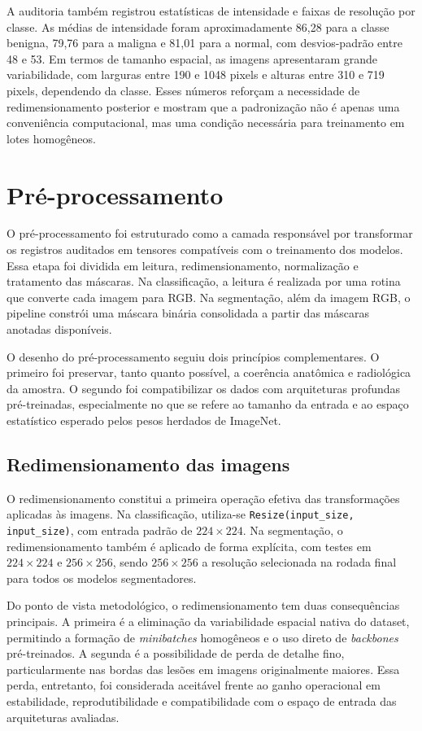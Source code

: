 \documentclass[tcc,capa]{texufpel}
\begin{document}
A auditoria também registrou estatísticas de intensidade e faixas de resolução por classe. As médias de intensidade foram aproximadamente 86,28 para a classe benigna, 79,76 para a maligna e 81,01 para a normal, com desvios-padrão entre 48 e 53. Em termos de tamanho espacial, as imagens apresentaram grande variabilidade, com larguras entre 190 e 1048 pixels e alturas entre 310 e 719 pixels, dependendo da classe. Esses números reforçam a necessidade de redimensionamento posterior e mostram que a padronização não é apenas uma conveniência computacional, mas uma condição necessária para treinamento em lotes homogêneos.

\section{Pré-processamento}

O pré-processamento foi estruturado como a camada responsável por transformar os registros auditados em tensores compatíveis com o treinamento dos modelos. Essa etapa foi dividida em leitura, redimensionamento, normalização e tratamento das máscaras. Na classificação, a leitura é realizada por uma rotina que converte cada imagem para RGB. Na segmentação, além da imagem RGB, o pipeline constrói uma máscara binária consolidada a partir das máscaras anotadas disponíveis.

O desenho do pré-processamento seguiu dois princípios complementares. O primeiro foi preservar, tanto quanto possível, a coerência anatômica e radiológica da amostra. O segundo foi compatibilizar os dados com arquiteturas profundas pré-treinadas, especialmente no que se refere ao tamanho da entrada e ao espaço estatístico esperado pelos pesos herdados de ImageNet.

\subsection{Redimensionamento das imagens}

O redimensionamento constitui a primeira operação efetiva das transformações aplicadas às imagens. Na classificação, utiliza-se \texttt{Resize(input\_size, input\_size)}, com entrada padrão de \(224 \times 224\). Na segmentação, o redimensionamento também é aplicado de forma explícita, com testes em \(224 \times 224\) e \(256 \times 256\), sendo \(256 \times 256\) a resolução selecionada na rodada final para todos os modelos segmentadores.

Do ponto de vista metodológico, o redimensionamento tem duas consequências principais. A primeira é a eliminação da variabilidade espacial nativa do dataset, permitindo a formação de \textit{minibatches} homogêneos e o uso direto de \textit{backbones} pré-treinados. A segunda é a possibilidade de perda de detalhe fino, particularmente nas bordas das lesões em imagens originalmente maiores. Essa perda, entretanto, foi considerada aceitável frente ao ganho operacional em estabilidade, reprodutibilidade e compatibilidade com o espaço de entrada das arquiteturas avaliadas.
\end{document}
